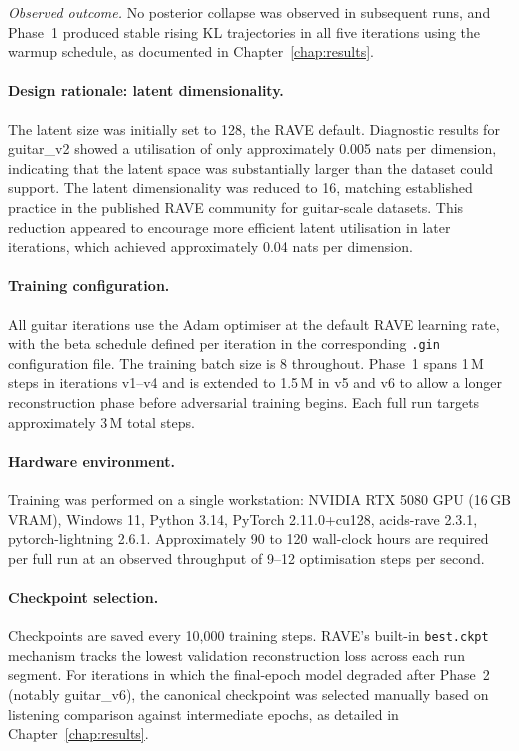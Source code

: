 \documentclass[a4paper,11pt,oneside,openany]{book}
\begin{document}
\textit{Observed outcome.} No posterior collapse was observed in subsequent runs, and Phase~1 produced stable rising KL trajectories in all five iterations using the warmup schedule, as documented in Chapter~\ref{chap:results}.

\paragraph{Design rationale: latent dimensionality.} The latent size was initially set to 128, the RAVE default. Diagnostic results for guitar\_v2 showed a utilisation of only approximately 0.005 nats per dimension, indicating that the latent space was substantially larger than the dataset could support. The latent dimensionality was reduced to 16, matching established practice in the published RAVE community for guitar-scale datasets. This reduction appeared to encourage more efficient latent utilisation in later iterations, which achieved approximately 0.04 nats per dimension.

\paragraph{Training configuration.} All guitar iterations use the Adam optimiser at the default RAVE learning rate, with the beta schedule defined per iteration in the corresponding \texttt{.gin} configuration file. The training batch size is 8 throughout. Phase~1 spans 1\,M steps in iterations v1--v4 and is extended to 1.5\,M in v5 and v6 to allow a longer reconstruction phase before adversarial training begins. Each full run targets approximately 3\,M total steps.

\paragraph{Hardware environment.} Training was performed on a single workstation: NVIDIA RTX 5080 GPU (16\,GB VRAM), Windows 11, Python 3.14, PyTorch 2.11.0+cu128, acids-rave 2.3.1, pytorch-lightning 2.6.1. Approximately 90 to 120 wall-clock hours are required per full run at an observed throughput of 9--12 optimisation steps per second.

\paragraph{Checkpoint selection.} Checkpoints are saved every 10,000 training steps. RAVE's built-in \texttt{best.ckpt} mechanism tracks the lowest validation reconstruction loss across each run segment. For iterations in which the final-epoch model degraded after Phase~2 (notably guitar\_v6), the canonical checkpoint was selected manually based on listening comparison against intermediate epochs, as detailed in Chapter~\ref{chap:results}.
\end{document}
